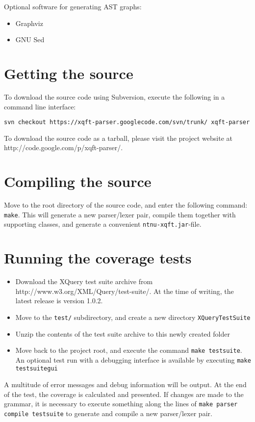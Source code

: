 Optional software for generating AST graphs:
\begin{itemize}
  \item Graphviz
  \item GNU Sed
\end{itemize}

\section*{Getting the source}
To download the source code using Subversion, execute the following in a
command line interface:

\verb!svn checkout https://xqft-parser.googlecode.com/svn/trunk/ xqft-parser!

To download the source code as a tarball, please visit the project website at
http://code.google.com/p/xqft-parser/.

\section*{Compiling the source}
Move to the root directory of the source code, and enter the following command:
\verb!make!. This will generate a new parser/lexer pair, compile them together
with supporting classes, and generate a convenient \verb!ntnu-xqft.jar!-file.

\section*{Running the coverage tests}
\begin{itemize}
\item Download the XQuery test suite archive from
http://www.w3.org/XML/Query/test-suite/. At the time of writing, the latest
release is version 1.0.2. 
\item Move to the \verb!test/! subdirectory, and create a new directory
\verb!XQueryTestSuite!
\item Unzip the contents of the test suite archive to this newly created folder
\item Move back to the project root, and execute the command 
\verb!make testsuite!. An optional test run with a debugging interface is
available by executing \verb!make testsuitegui!
\end{itemize}

A multitude of error messages and debug information will be output. At the end
of the test, the coverage is calculated and presented. If changes are made to
the grammar, it is necessary to execute something along the lines of 
\verb!make parser compile testsuite! to generate and compile a new parser/lexer
pair.